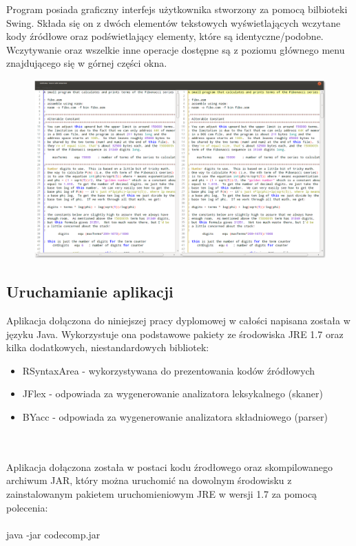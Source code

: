 \documentclass[a4paper,12pt]{article}
\begin{document}
\pagebreak

Program posiada graficzny interfejs użytkownika stworzony za pomocą bilbioteki Swing. Składa się on z dwóch elementów tekstowych wyświetlających wczytane kody źródłowe oraz podświetlający elementy, które są identyczne/podobne. Wczytywanie oraz wszelkie inne operacje dostępne są z poziomu głównego menu znajdującego się w górnej części okna.

\begin{figure}[!h]
\centering
\includegraphics[scale=0.33]{gfx/main_window.png}
\end{figure}

\newpage

\subsection{Uruchamianie aplikacji}

Aplikacja dołączona do niniejszej pracy dyplomowej w całości napisana została w języku Java. Wykorzystuje ona podstawowe pakiety ze środowiska JRE 1.7 oraz kilka dodatkowych, niestandardowych bibliotek:
\begin{itemize}
\item RSyntaxArea - wykorzystywana do prezentowania kodów źródłowych
\item JFlex - odpowiada za wygenerowanie analizatora leksykalnego (skaner)
\item BYacc - odpowiada za wygenerowanie analizatora składniowego (parser)
\end{itemize}
\\ \\
Aplikacja dołączona została w postaci kodu źrodłowego oraz skompilowanego archiwum JAR, który można uruchomić na dowolnym środowisku z zainstalowanym pakietem uruchomieniowym JRE w wersji 1.7 za pomocą polecenia:
\\ \\
java -jar codecomp.jar
\end{document}
